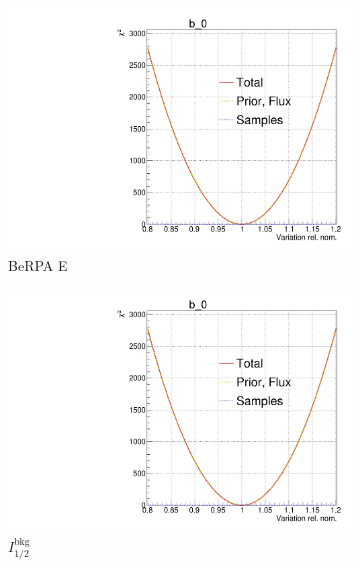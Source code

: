 \begin{figure}[h]
	\begin{subfigure}[t]{0.32\textwidth}
		\includegraphics[width=\textwidth, trim={0mm 0mm 0mm 11mm}, clip,page=118]{figures/mach3/Asimov/Full_LLHscan_18July_BeRPA_U_ND280logL_scan}
		\caption{BeRPA E}
	\end{subfigure}
	\begin{subfigure}[t]{0.32\textwidth}
		\includegraphics[width=\textwidth, trim={0mm 0mm 0mm 11mm}, clip,page=122]{figures/mach3/Asimov/Full_LLHscan_18July_BeRPA_U_ND280logL_scan}
		\caption{$I_{1/2}^\text{bkg}$}
	\end{subfigure}
	\begin{subfigure}[t]{0.32\textwidth}

\end{subfigure}
\end{figure}

